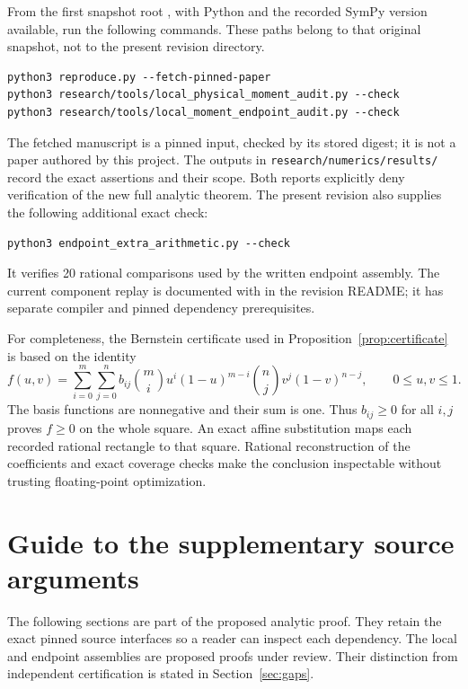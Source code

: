 \documentclass[11pt]{article}
\theoremstyle{definition}
\newcommand{\code}[1]{\texttt{\small #1}}
\begin{document}
From the first snapshot root
, with Python and the recorded
SymPy version available, run the following commands. These paths belong
to that original snapshot, not to the present revision directory.
\begin{verbatim}
python3 reproduce.py --fetch-pinned-paper
python3 research/tools/local_physical_moment_audit.py --check
python3 research/tools/local_moment_endpoint_audit.py --check
\end{verbatim}
The fetched manuscript is a pinned input, checked by its stored digest;
it is not a paper authored by this project. The outputs in
\code{research/numerics/results/} record the exact assertions and their
scope. Both reports explicitly deny verification of the new full
analytic theorem. The present revision also supplies the following additional exact check:
\begin{verbatim}
python3 endpoint_extra_arithmetic.py --check
\end{verbatim}
It verifies 20 rational comparisons used by the written endpoint assembly.
The current component replay is documented with
 in the revision README; it has separate
compiler and pinned dependency prerequisites.

For completeness, the Bernstein certificate used in
Proposition~\ref{prop:certificate} is based on the identity
\[
 f(u,v)=\sum_{i=0}^{m}\sum_{j=0}^{n}
 b_{ij}\binom mi u^i(1-u)^{m-i}\binom nj v^j(1-v)^{n-j},
 \qquad 0\le u,v\le1.
\]
The basis functions are nonnegative and their sum is one. Thus
$b_{ij}\ge0$ for all $i,j$ proves $f\ge0$ on the whole square.
An exact affine substitution maps each recorded rational rectangle to
that square. Rational reconstruction of the coefficients and exact
coverage checks make the conclusion inspectable without trusting
floating-point optimization.

\clearpage
\section*{Guide to the supplementary source arguments}
The following sections are part of the proposed analytic proof. They retain
the exact pinned source interfaces so a reader can inspect each dependency.
The local and endpoint assemblies are proposed proofs under review.
Their distinction from independent certification is stated in
Section~\ref{sec:gaps}.









\end{document}
